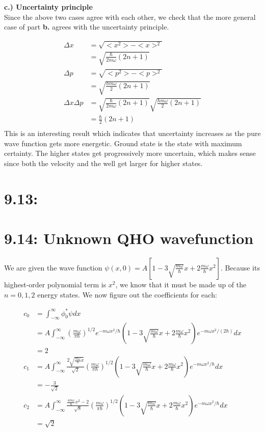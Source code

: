 \documentclass[10pt]{article} %
\begin{document}
\textbf{c.) Uncertainty principle}\\
Since the above two cases agree with each other, we check that the more general case of part
\textbf{b.} agrees with the uncertainty principle.

\begin{align*}
  \Delta x &= \sqrt{<x^2>-<x>^2}\\
  &= \sqrt{\frac{\hbar}{2m\omega} \left(2n+1\right)}\\
  \Delta p &= \sqrt{<p^2>-<p>^2}\\
  &= \sqrt{\frac{\hbar m\omega}{2}\left(2n + 1\right)}\\
  \Delta x \Delta p &= \sqrt{\frac{\hbar}{2m\omega} \left(2n+1\right)}
  \sqrt{\frac{\hbar m\omega}{2}\left(2n + 1\right)}\\
  &= \frac{\hbar}{2}(2n+1)\\
\end{align*}
This is an interesting result which indicates that uncertainty increases as the pure wave function
gets more energetic. Ground state is the state with maximum certainty. The higher states get
progressively more uncertain, which makes sense since both the velocity and the well get larger
for higher states.\\

\section{9.13: }

\section{9.14: Unknown QHO wavefunction}
We are given the wave function $\psi(x,0) = A\left[1 - 3\sqrt{\frac{m\omega}{\hbar}}x +
  2\frac{m\omega}{\hbar}x^2\right]$. Because its highest-order polynomial term is $x^2$, we know
that it must be made up of the $n = 0, 1, 2$ energy states. We now figure out the coefficients for
each:

\begin{align*}
  c_0 &= \int_{-\infty}^{\infty} \phi_0^*\psi dx\\
  &= A\int_{-\infty}^{\infty} \left(\frac{m\omega}{\pi\hbar}\right)^{1/2}e^{-m\omega x^2/\hbar}
  \left(1 - 3\sqrt{\frac{m\omega}{\hbar}}x +
  2\frac{m\omega}{\hbar}x^2\right)e^{-m\omega x^2/(2\hbar)}dx\\
  &= 2\\
  c_1 &= A\int_{-\infty}^{\infty} \frac{2\sqrt{\frac{m\omega}{\hbar}x}}{\sqrt{2}}
    \left(\frac{m\omega}{\pi\hbar}\right)^{1/2} \left(1 - 3\sqrt{\frac{m\omega}{\hbar}}x +
    2\frac{m\omega}{\hbar}x^2\right)e^{-m\omega x^2/\hbar}dx\\
 &= -\frac{3}{\sqrt{2}}\\
 c_2 &= A\int_{-\infty}^{\infty} \frac{\frac{4m\omega}{\hbar}x^2 - 2}{\sqrt{8}}
    \left(\frac{m\omega}{\pi\hbar}\right)^{1/2} \left(1 - 3\sqrt{\frac{m\omega}{\hbar}}x +
    2\frac{m\omega}{\hbar}x^2\right)e^{-m\omega x^2/\hbar}dx\\
 &= \sqrt{2}\\
\end{align*}
\end{document}
